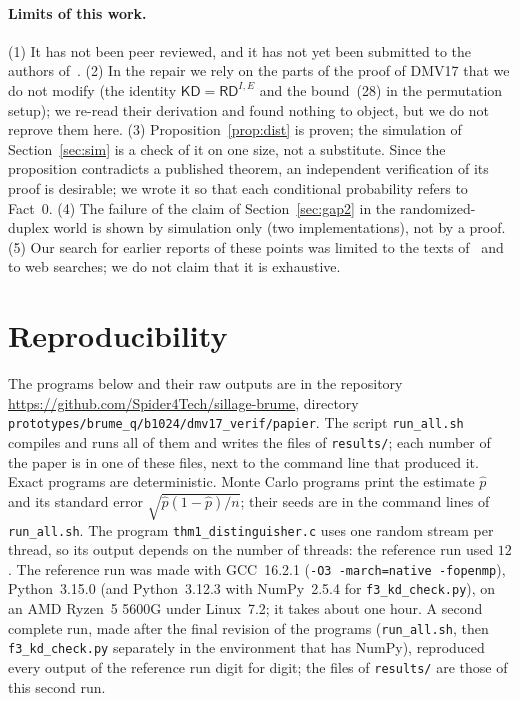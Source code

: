 \documentclass[11pt,a4paper]{article}
\theoremstyle{definition}
\theoremstyle{remark}
\newcommand{\KD}{\mathsf{KD}}
\newcommand{\RD}{\mathsf{RD}}
\newcommand{\file}[1]{\texttt{#1}}
\begin{document}
\paragraph{Limits of this work.}
(1) It has not been peer reviewed, and it has not yet been submitted to the authors of~\cite{DMV17}.
(2) In the repair we rely on the parts of the proof of DMV17 that we do not modify (the identity $\KD = \RD^{I,E}$ and the
bound~(28) in the permutation setup); we re-read their derivation and found nothing to object, but we do not reprove
them here.
(3) Proposition~\ref{prop:dist} is proven; the simulation of Section~\ref{sec:sim} is a check of it on one size, not a
substitute. Since the proposition contradicts a published theorem, an independent verification of its proof is
desirable; we wrote it so that each conditional probability refers to Fact~0.
(4) The failure of the claim of Section~\ref{sec:gap2} in the randomized-duplex world is shown by simulation only (two
implementations), not by a proof.
(5) Our search for earlier reports of these points was limited to the texts of~\cite{DMV17,DM19,Men23,CDN23,CDN24,LM24,LM25}
and to web searches; we do not claim that it is exhaustive.

\appendix
\section{Reproducibility}\label{app:repro}
The programs below and their raw outputs are in the repository\\
\url{https://github.com/Spider4Tech/sillage-brume}, directory\\
\file{prototypes/brume\_q/b1024/dmv17\_verif/papier}. The script \file{run\_all.sh} compiles and runs all of them and writes the files of
\file{results/}; each number of the paper is in one of these files, next to the command line that produced it.
Exact programs are deterministic. Monte Carlo programs print the estimate $\hat p$ and its standard error
$\sqrt{\hat p(1-\hat p)/n}$; their seeds are in the command lines of \file{run\_all.sh}. The program \file{thm1\_distinguisher.c}
uses one random stream per thread, so its output depends on the number of threads: the reference run used $12$.
The reference run was made with GCC~16.2.1 (\texttt{-O3 -march=native -fopenmp}), Python~3.15.0 (and Python~3.12.3 with
NumPy~2.5.4 for \file{f3\_kd\_check.py}), on an AMD Ryzen~5 5600G under Linux~7.2; it takes about one hour. A second complete run, made after the final revision of
the programs (\file{run\_all.sh}, then \file{f3\_kd\_check.py} separately in the environment that has NumPy), reproduced every
output of the reference run digit for digit; the files of \file{results/} are those of this second run.
\end{document}
